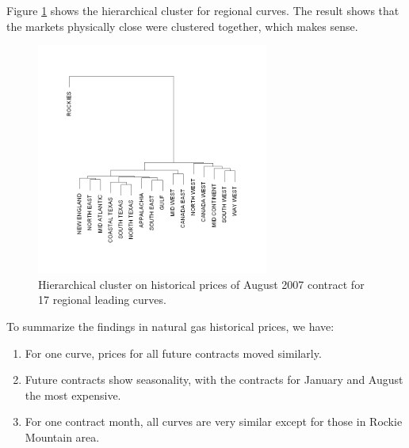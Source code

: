 Figure \ref{ng-region-hclust} shows the hierarchical cluster 
for regional curves. The result shows that the markets physically close
were clustered together, which makes sense. 
\begin{figure}[htbp]
\centering
\includegraphics[width=3in, height=3in]{figures/regional-0708-04.png}
\caption{Hierarchical cluster on historical prices of August 2007 contract
for 17 regional leading curves.}
\label{ng-region-hclust}
\end{figure}

To summarize the findings in natural gas historical prices, we have:
\begin{enumerate}
\item For one curve, prices for all future contracts moved similarly.
\item Future contracts show seasonality, with the contracts for 
  January and August the most expensive.
\item For one contract month, all curves are very similar except
for those in Rockie Mountain area. 
\end{enumerate}

